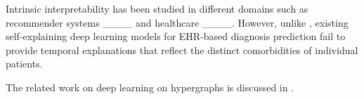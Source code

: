 Intrinsic interpretability has been studied in different domains such as recommender systems ____ and healthcare ____. However, unlike \method, existing self-explaining deep learning models for EHR-based diagnosis prediction fail to provide temporal explanations that reflect the distinct comorbidities of individual patients.

The related work on deep learning on hypergraphs is discussed in .